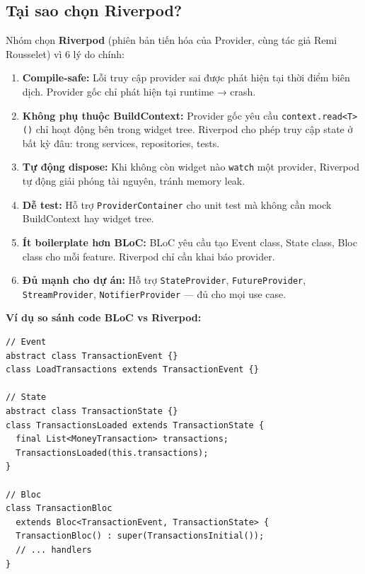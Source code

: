 \subsection{Tại sao chọn Riverpod?}

Nhóm chọn \textbf{Riverpod} (phiên bản tiến hóa của Provider, cùng tác giả Remi Rousselet) vì 6 lý do chính:

\begin{enumerate}
  \item \textbf{Compile-safe:} Lỗi truy cập provider sai được phát hiện tại thời điểm biên dịch. Provider gốc chỉ phát hiện tại runtime → crash.
  
  \item \textbf{Không phụ thuộc BuildContext:} Provider gốc yêu cầu \texttt{context.read<T>()} chỉ hoạt động bên trong widget tree. Riverpod cho phép truy cập state ở bất kỳ đâu: trong services, repositories, tests.
  
  \item \textbf{Tự động dispose:} Khi không còn widget nào \texttt{watch} một provider, Riverpod tự động giải phóng tài nguyên, tránh memory leak.
  
  \item \textbf{Dễ test:} Hỗ trợ \texttt{ProviderContainer} cho unit test mà không cần mock BuildContext hay widget tree.
  
  \item \textbf{Ít boilerplate hơn BLoC:} BLoC yêu cầu tạo Event class, State class, Bloc class cho mỗi feature. Riverpod chỉ cần khai báo provider.
  
  \item \textbf{Đủ mạnh cho dự án:} Hỗ trợ \texttt{StateProvider}, \texttt{FutureProvider}, \texttt{StreamProvider}, \texttt{NotifierProvider} --- đủ cho mọi use case.
\end{enumerate}

\textbf{Ví dụ so sánh code BLoC vs Riverpod:}

\begin{lstlisting}[caption={BLoC: cần 3 class cho mỗi feature}]
// Event
abstract class TransactionEvent {}
class LoadTransactions extends TransactionEvent {}

// State
abstract class TransactionState {}
class TransactionsLoaded extends TransactionState {
  final List<MoneyTransaction> transactions;
  TransactionsLoaded(this.transactions);
}

// Bloc
class TransactionBloc
  extends Bloc<TransactionEvent, TransactionState> {
  TransactionBloc() : super(TransactionsInitial());
  // ... handlers
}
\end{lstlisting}

